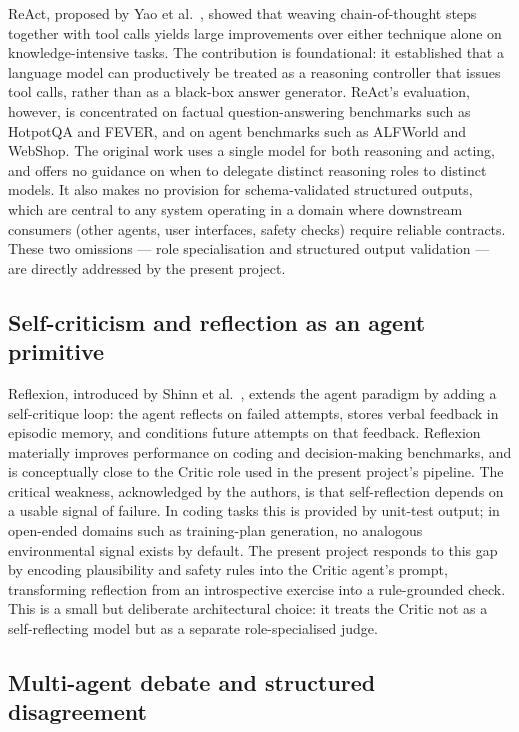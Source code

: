 ReAct, proposed by Yao et al.~\cite{yao2022react}, showed that weaving chain-of-thought steps together with tool calls yields large improvements over either technique alone on knowledge-intensive tasks. The contribution is foundational: it established that a language model can productively be treated as a reasoning controller that issues tool calls, rather than as a black-box answer generator. ReAct's evaluation, however, is concentrated on factual question-answering benchmarks such as HotpotQA and FEVER, and on agent benchmarks such as ALFWorld and WebShop. The original work uses a single model for both reasoning and acting, and offers no guidance on when to delegate distinct reasoning roles to distinct models. It also makes no provision for schema-validated structured outputs, which are central to any system operating in a domain where downstream consumers (other agents, user interfaces, safety checks) require reliable contracts. These two omissions --- role specialisation and structured output validation --- are directly addressed by the present project.

\subsection{Self-criticism and reflection as an agent primitive}

Reflexion, introduced by Shinn et al.~\cite{shinn2023reflexion}, extends the agent paradigm by adding a self-critique loop: the agent reflects on failed attempts, stores verbal feedback in episodic memory, and conditions future attempts on that feedback. Reflexion materially improves performance on coding and decision-making benchmarks, and is conceptually close to the Critic role used in the present project's pipeline. The critical weakness, acknowledged by the authors, is that self-reflection depends on a usable signal of failure. In coding tasks this is provided by unit-test output; in open-ended domains such as training-plan generation, no analogous environmental signal exists by default. The present project responds to this gap by encoding plausibility and safety rules into the Critic agent's prompt, transforming reflection from an introspective exercise into a rule-grounded check. This is a small but deliberate architectural choice: it treats the Critic not as a self-reflecting model but as a separate role-specialised judge.

\subsection{Multi-agent debate and structured disagreement}

